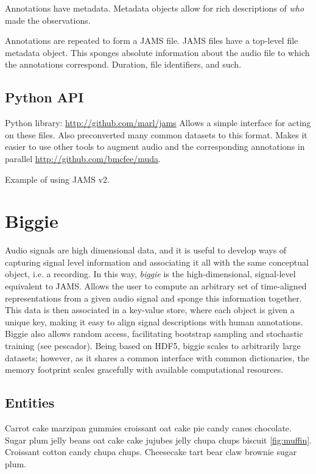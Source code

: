 Annotations have metadata.
Metadata objects allow for rich descriptions of \emph{who} made the observations.

Annotations are repeated to form a JAMS file.
JAMS files have a top-level file metadata object.
This sponges absolute information about the audio file to which the annotations correspond.
Duration, file identifiers, and such.


\subsection{Python API}
\label{subsec:jams_tools}

Python library: \url{http://github.com/marl/jams}
Allows a simple interface for acting on these files.
Also preconverted many common datasets to this format.
Makes it easier to use other tools to augment audio and the corresponding annotations in parallel \url{http://github.com/bmcfee/muda}.

Example of using JAMS v2.


\section{Biggie}
\label{sec:biggie}

Audio signals are high dimensional data, and it is useful to develop ways of capturing signal level information and associating it all with the same conceptual object, i.e. a recording.
In this way, \emph{biggie} is the high-dimensional, signal-level equivalent to JAMS.
Allows the user to compute an arbitrary set of time-aligned representations from a given audio signal and sponge this information together.
This data is then associated in a key-value store, where each object is given a unique key, making it easy to align signal descriptions with human annotations.
Biggie also allows random access, facilitating bootstrap sampling and stochastic training (see pescador).
Being based on HDF5, biggie scales to arbitrarily large datasets; however, as it shares a common interface with common dictionaries, the memory footprint scales gracefully with available computational resources.


\subsection{Entities}
\label{subsec:entities}

Carrot cake marzipan gummies croissant oat cake pie candy canes chocolate.
Sugar plum jelly beans oat cake cake jujubes jelly chupa chups biscuit \ref{fig:muffin}.
Croissant cotton candy chupa chups.
Cheesecake tart bear claw brownie sugar plum.

